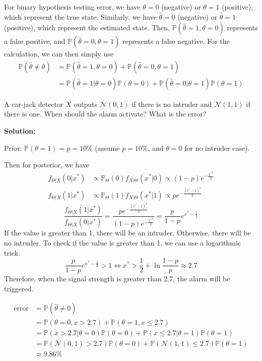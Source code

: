 For binary hypothesis testing error, we have \(\theta = 0\) (negative) or \(\theta = 1\) (positive), which represent the true state. Similarly, we have \(\hat{\theta} = 0\) (negative) or \(\hat{\theta} = 1\) (positive), which represent the estimated state. Then, \(\mathbb{P}(\hat{\theta} = 1, \theta = 0)\) represents a false positive, and \(\mathbb{P}(\hat{\theta} = 0, \theta = 1)\) represents a false negative. For the calculation, we can then simply use 
\[
\begin{aligned}
  \mathbb{P} (\hat{\theta} \neq \theta) &= \mathbb{P}(\hat{\theta} = 1, \theta = 0) + \mathbb{P}(\hat{\theta} = 0, \theta = 1) \\ 
  &= \mathbb{P}(\hat{\theta} = 1 \vert \theta = 0)\mathbb{P}(\theta = 0) + \mathbb{P}(\hat{\theta} = 0 \vert \theta = 1)\mathbb{P}(\theta = 1)
\end{aligned}
\]

\begin{eg}
  A car-jack detector \(X\) outputs \(\mathcal{N}(0, 1)\) if there is no intruder and \(\mathcal{N}(1, 1)\) if there is one. When should the alarm activate? What is the error?

  \textbf{Solution:} 

  Prior: \(\mathbb{P} (\theta = 1) = p = 10\%\) (assume \(p = 10\%\), and \(\theta = 0\) for no intruder case).

  Then for posterior, we have 
  \[
    \begin{aligned}
      f_{\Theta \vert X} (0 \vert x^*) & \propto \mathbb{P}_{\Theta} (0) f_{X \vert \Theta} (x^* \vert 0) \propto (1 - p)e^{- \frac{{x^*}^2}{2}} \\
      f_{\Theta \vert X} (1 \vert x^*) & \propto \mathbb{P}_{\Theta} (1) f_{X \vert \Theta} (x^* \vert 1) \propto pe^{- \frac{(x^* - 1)^2}{2}}
    \end{aligned}
  \]
  \[
    \dfrac{f_{\Theta \vert X} (1 \vert x^*)}{f_{\Theta \vert X} (0 \vert x^*)} = \dfrac{pe^{- \frac{(x^* - 1)^2}{2}}}{(1 - p)e^{- \frac{{x^*}^2}{2}}} = \dfrac{p}{1 - p} e^{x^* - \frac{1}{2}}
  \]
  If the value is greater than 1, there will be an intruder. Otherwise, there will be no intruder. To check if the value is greater than 1, we can use a logarithmic trick.
  \[
    \dfrac{p}{1 - p} e^{x^* - \frac{1}{2}} > 1 \Longleftrightarrow x^* > \dfrac{1}{2} + \ln \dfrac{1 - p}{p} \approx 2.7
  \]
  Therefore, when the signal strength is greater than 2.7, the alarm will be triggered.

  \[
    \begin{aligned}
      \text{error} &= \mathbb{P}(\hat{\theta} \neq 0) \\
      &= \mathbb{P}(\theta = 0, x > 2.7) + \mathbb{P}(\theta = 1, x \leq 2.7) \\
      &= \mathbb{P}(x > 2.7 \vert \theta = 0)\mathbb{P}(\theta = 0) + \mathbb{P}(x \leq 2.7 \vert \theta = 1)\mathbb{P}(\theta = 1) \\
      &= \mathbb{P}(\mathcal{N}(0, 1) > 2.7)\mathbb{P}(\theta = 0) + \mathbb{P}(\mathcal{N} (1, 1) \leq 2.7)\mathbb{P}(\theta = 1) \\
      &\approx 9.86\%
    \end{aligned}
  \]

\end{eg}

